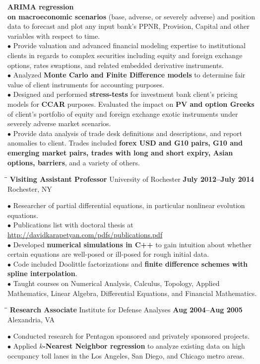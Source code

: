 \documentclass{resume}
\begin{document}
\begin{resume}
\textbf{ARIMA regression \\ on macroeconomic scenarios} (base, adverse, or severely adverse) and position data to forecast and plot any input bank’s PPNR,
Provision, Capital and other variables with respect to time.  \\
$\bullet$ Provide valuation and advanced financial modeling expertise to
institutional clients in regards to complex securities including equity and
foreign exchange options, rates swaptions, and related embedded derivative
instruments.  \\
$\bullet$ 
Analyzed \textbf{Monte Carlo and Finite Difference models} to determine fair value of
client instruments for accounting purposes.  \\
$\bullet$ Designed and performed \textbf{stress-tests} for investment bank
client’s pricing models for \textbf{CCAR} purposes. Evaluated the impact on
\textbf{PV and option Greeks} of client’s portfolio of equity and foreign exchange exotic instruments under severely adverse market scenarios. 
\\
$\bullet$
Provide data analysis of trade desk definitions and descriptions, and report
anomalies to client. Trades included \textbf{forex USD and G10 pairs, G10 and
	emerging market pairs, trades with long and short expiry, Asian options,
barriers}, and a variety of others.
\begin{tabbing}
\hspace{2.3in}\= \hspace{2.6in}\= \kill
{\bf Visiting Assistant Professor} \>University of Rochester     
\>\textbf{July 2012--July 2014} \\
    \>Rochester, NY 
\end{tabbing}
$\bullet$ Researcher of partial differential equations, in particular nonlinear evolution equations.  
\\
$\bullet$ Publications list with doctoral thesis at \url{http://davidkarapetyan.com/pdfs/publications.pdf}
\\
$\bullet$ Developed \textbf{numerical simulations in C++}  to gain
intuition about whether certain  equations are well-posed
or ill-posed for rough initial data. \\
$\bullet$ Code included Doolittle factorizations and \textbf{finite
difference schemes with spline interpolation}. \\
$\bullet$ Taught courses on Numerical Analysis, Calculus,
Topology, Applied Mathematics, Linear Algebra,
Differential Equations, and Financial Mathematics.
\begin{tabbing}
\hspace{2.3in}\= \hspace{2.6in}\= \kill
{\bf Research Associate } \> Institute for
Defense Analyses \>  
\textbf{Aug 2004--Aug 2005}\\
    \>Alexandria, VA
\end{tabbing}
$\bullet$ Conducted research for Pentagon sponsored and privately
sponsored projects. 
\\ 
$\bullet$ Applied \textbf{$k$-Nearest Neighbor regression} to analyze existing data on high
occupancy toll lanes in the Los
Angeles, San Diego, and
Chicago metro areas.
\newpage

\end{resume}
\end{document}

